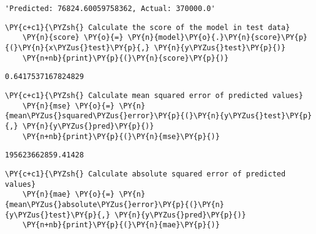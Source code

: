                 \begin{tcolorbox}[breakable, size=fbox, boxrule=.5pt, pad at break*=1mm, opacityfill=0]
    \begin{Verbatim}[commandchars=\\\{\}]
    'Predicted: 76824.60059758362, Actual: 370000.0'
    \end{Verbatim}
    \end{tcolorbox}
            
        \begin{tcolorbox}[breakable, size=fbox, boxrule=1pt, pad at break*=1mm,colback=cellbackground, colframe=cellborder]
    \begin{Verbatim}[commandchars=\\\{\}]
    \PY{c+c1}{\PYZsh{} Calculate the score of the model in test data}
    \PY{n}{score} \PY{o}{=} \PY{n}{model}\PY{o}{.}\PY{n}{score}\PY{p}{(}\PY{n}{x\PYZus{}test}\PY{p}{,} \PY{n}{y\PYZus{}test}\PY{p}{)}
    \PY{n+nb}{print}\PY{p}{(}\PY{n}{score}\PY{p}{)}
    \end{Verbatim}
    \end{tcolorbox}
    
        \begin{Verbatim}[commandchars=\\\{\}]
    0.6417537167824829
        \end{Verbatim}
    
        \begin{tcolorbox}[breakable, size=fbox, boxrule=1pt, pad at break*=1mm,colback=cellbackground, colframe=cellborder]
    \begin{Verbatim}[commandchars=\\\{\}]
    \PY{c+c1}{\PYZsh{} Calculate mean squared error of predicted values}
    \PY{n}{mse} \PY{o}{=} \PY{n}{mean\PYZus{}squared\PYZus{}error}\PY{p}{(}\PY{n}{y\PYZus{}test}\PY{p}{,} \PY{n}{y\PYZus{}pred}\PY{p}{)}
    \PY{n+nb}{print}\PY{p}{(}\PY{n}{mse}\PY{p}{)}
    \end{Verbatim}
    \end{tcolorbox}
    
        \begin{Verbatim}[commandchars=\\\{\}]
    195623662859.41428
        \end{Verbatim}
    
        \begin{tcolorbox}[breakable, size=fbox, boxrule=1pt, pad at break*=1mm,colback=cellbackground, colframe=cellborder]
    \begin{Verbatim}[commandchars=\\\{\}]
    \PY{c+c1}{\PYZsh{} Calculate absolute squared error of predicted values}
    \PY{n}{mae} \PY{o}{=} \PY{n}{mean\PYZus{}absolute\PYZus{}error}\PY{p}{(}\PY{n}{y\PYZus{}test}\PY{p}{,} \PY{n}{y\PYZus{}pred}\PY{p}{)}
    \PY{n+nb}{print}\PY{p}{(}\PY{n}{mae}\PY{p}{)}
    \end{Verbatim}
    \end{tcolorbox}
    
